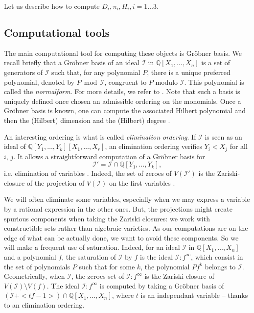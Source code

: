 Let us describe how to compute $D_{i} , \pi_{i} ,H_{i} ,i=1 \ldots 3$.

\subsection{Computational tools}

The main computational tool for computing these objects is Gr\"obner basis. We recall briefly 
that a Gr\"obner basis of an ideal $\mathcal I$ in $\mathbb Q[X_1,\ldots,X_n]$ is a set of 
generators of $\mathcal I$ such that, for any polynomial $P$, there is a unique preferred 
polynomial, denoted by $P\,\; \mathrm{mod}\, \;\mathcal I$, congruent to $P$ modulo $\mathcal I$. 
This polynomial is called the \emph{normalform}. For more details, we refer to \cite{CLO1997}. 
Note that such a basis is uniquely defined once chosen an admissible ordering on the monomials. Once a Gröbner basis is known, one can compute the associated Hilbert polynomial and then the (Hilbert) dimension and the (Hilbert) degree \cite[Section 9.3]{CLO1997}.

An interesting ordering is what is called \emph{elimination ordering}. If $\mathcal I$ is seen 
as an ideal of $\mathbb Q[Y_1,\ldots, Y_k][X_1,\ldots,X_r]$,  an elimination ordering verifies 
$Y_i<X_j$ for all $i$, $j$. It allows a straightforward computation of a Gröbner basis for $$
\mathcal I'=\mathcal I\cap \mathbb Q[Y_1,\ldots,Y_k],$$ i.e. elimination of variables \cite[Ch. 
3]{CLO1997}. Indeed, the set of zeroes of $V(\mathcal I')$ is the Zariski-closure of the 
projection of $V(\mathcal I)$ on the first variables \cite[Section 4.4]{CLO1997}.

We will often eliminate some variables, especially when we may express a variable by a 
rational expression in the other ones. But, the projections might create spurious components when 
taking the Zariski closures: we work with constructible sets rather than algebraic varieties. As our computations are on the edge of what can be actually done, 
we want to avoid these components. So we will make a frequent use of saturation. Indeed, for 
an ideal $\mathcal I$ in $\mathbb Q[X_1,\ldots,X_n]$ and a  polynomial
$f$, the saturation of $\mathcal I$ by $f$ is the ideal $\mathcal I:f^\infty$,
which consist in the set of polynomials $P$ such that for some $k$,
the polynomial $Pf^k$ belongs to $\mathcal I$. Geometrically, when
$\mathcal I$, the zeroes set of $\mathcal I:f^\infty$ is the Zariski closure of $V(\mathcal I)\setminus V(f)$. The ideal $\mathcal I:f^\infty$ is computed by taking a Gröbner basis of $(\mathcal I+<tf-1>)\cap \mathbb Q[X_1,\ldots ,X_n]$, where $t$ is an independant variable -- thanks to an elimination ordering.
 
